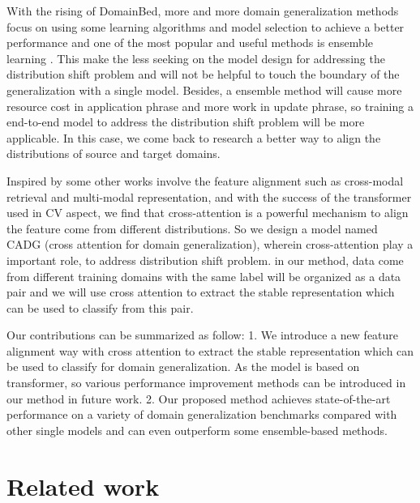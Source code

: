 \documentclass{article}
\begin{document}
With the rising of DomainBed, more and more domain generalization methods focus on using some learning algorithms and model selection to achieve a better performance and one of the most popular and useful methods is ensemble learning\cite{hansen1990neural} \cite{zhou2018diverse}. This make the less seeking on the model design for addressing the distribution shift problem and will not be helpful to touch the boundary of the generalization with a single model. Besides, a ensemble method will cause more resource cost in application phrase and more work in update phrase, so training a end-to-end model to address the distribution shift problem will be more applicable. In this case, we come back to research a better way to align the distributions of source and target domains. 

Inspired by some other works involve the feature alignment such as cross-modal retrieval\cite{geigle2021retrieve} and multi-modal representation\cite{hu2021unit}, and with the success of the transformer used in CV aspect, we find that cross-attention is a powerful mechanism to align the feature come from different distributions. So we design a model named CADG (cross attention for domain generalization), wherein cross-attention play a important role, to address distribution shift problem. in our method, data come from different training domains with the same label will be organized as a data pair and we will use cross attention to extract the stable representation which can be used to classify from this pair. 

Our contributions can be summarized as follow:
1. We introduce a new feature alignment way with cross attention to extract the stable representation which can be used to classify for domain generalization. As the model is based on transformer, so various performance improvement methods can be introduced in our method in future work.
2. Our proposed method achieves state-of-the-art performance on a variety of domain generalization benchmarks compared with other single models and can even outperform some ensemble-based methods. 


\section{Related work}
\label{sec:headings}
\end{document}
